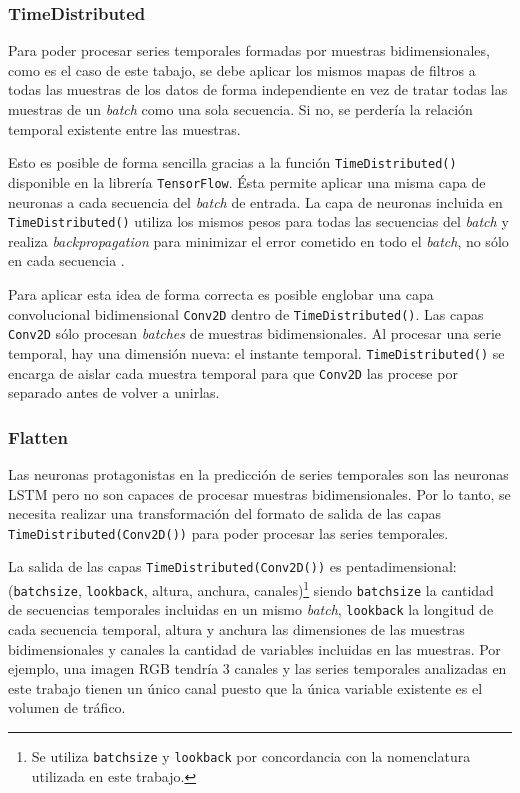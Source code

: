 \subsubsection{TimeDistributed}
Para poder procesar series temporales formadas por muestras bidimensionales, como es el caso de este tabajo, se debe aplicar los mismos mapas de filtros a todas las muestras de los datos de forma independiente en vez de tratar todas las muestras de un \textit{batch} como una sola secuencia. Si no, se perdería la relación temporal existente entre las muestras.

Esto es posible de forma sencilla gracias a la función \texttt{TimeDistributed()} disponible en la librería \texttt{TensorFlow}. Ésta permite aplicar una misma capa de neuronas a cada secuencia del \textit{batch} de entrada. La capa de neuronas incluida en \texttt{TimeDistributed()} utiliza los mismos pesos para todas las secuencias del \textit{batch} y realiza \textit{backpropagation} para minimizar el error cometido en todo el \textit{batch}, no sólo en cada secuencia \cite{timedistributed}.

Para aplicar esta idea de forma correcta es posible englobar una capa convolucional bidimensional \texttt{Conv2D} dentro de \texttt{TimeDistributed()}. Las capas \texttt{Conv2D} sólo procesan \textit{batches} de muestras bidimensionales. Al procesar una serie temporal, hay una dimensión nueva: el instante temporal. \texttt{TimeDistributed()} se encarga de aislar cada muestra temporal para que \texttt{Conv2D} las procese por separado antes de volver a unirlas.

\subsubsection{Flatten}
Las neuronas protagonistas en la predicción de series temporales son las neuronas LSTM pero no son capaces de procesar muestras bidimensionales. Por lo tanto, se necesita realizar una transformación del formato de salida de las capas \\ \texttt{TimeDistributed(Conv2D())} para poder procesar las series temporales.

La salida de las capas \texttt{TimeDistributed(Conv2D())} es pentadimensional: (\texttt{batchsize}, \texttt{lookback}, altura, anchura, canales)\footnote{Se utiliza \texttt{batchsize} y \texttt{lookback} por concordancia con la nomenclatura utilizada en este trabajo.} siendo \texttt{batchsize} la cantidad de secuencias temporales incluidas en un mismo \textit{batch}, \texttt{lookback} la longitud de cada secuencia temporal, altura y anchura las dimensiones de las muestras bidimensionales y canales la cantidad de variables incluidas en las muestras. Por ejemplo, una imagen RGB tendría 3 canales y las series temporales analizadas en este trabajo tienen un único canal puesto que la única variable existente es el volumen de tráfico.

